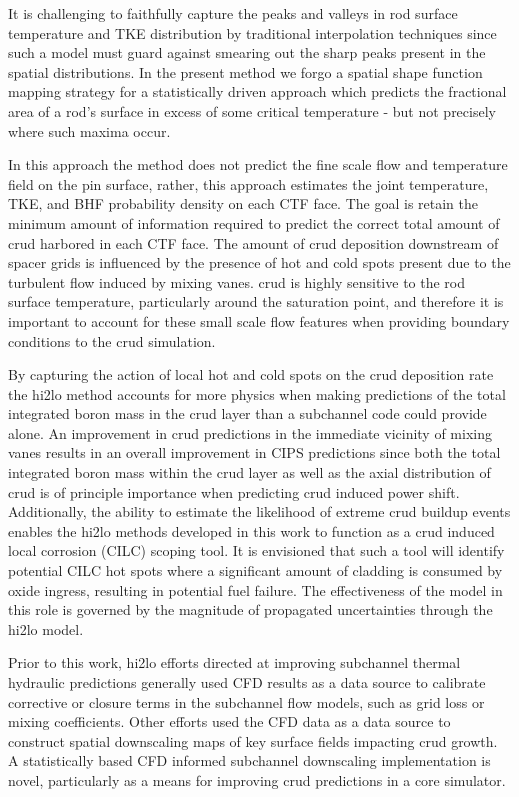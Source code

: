 It is challenging to faithfully capture the peaks and valleys in
rod surface temperature and TKE distribution by traditional interpolation
techniques since such a model must guard against smearing out the sharp peaks
present in the spatial distributions.
In the present method we forgo a spatial shape function mapping strategy
for a statistically driven approach which predicts the fractional
area of a rod's surface in excess of some critical temperature - but not
precisely where such maxima occur.

In this approach the method does not predict the fine scale flow and temperature field on the pin surface, rather, this approach estimates the joint temperature, TKE, and BHF probability density on each CTF face.  The goal is retain the minimum amount of information required to predict the correct total amount of crud harbored in each CTF face.  The amount of crud deposition downstream of spacer grids is influenced by the presence of hot and cold spots present due to the turbulent flow induced by mixing vanes.  crud is highly sensitive to the rod surface temperature, particularly around the saturation point, and therefore it is important to account for these small scale flow features when providing boundary conditions to the crud simulation.

By capturing the action of local hot and cold spots on the crud deposition rate the hi2lo method accounts for more physics when making predictions of the total integrated boron mass in the crud layer than a subchannel code could provide alone.  An improvement in crud predictions in the immediate vicinity of mixing vanes results in an overall improvement in CIPS predictions since both the total integrated boron mass within the crud layer as well as the axial distribution of crud is of principle importance when predicting crud induced power shift.  Additionally, the ability to estimate the likelihood of extreme crud buildup events enables the hi2lo methods developed in this work to function as a crud induced local corrosion (CILC) scoping tool.  It is envisioned that such a tool will identify potential CILC hot spots where a significant amount of cladding is consumed by oxide ingress, resulting in potential fuel failure.  The effectiveness of the model in this role is governed by the magnitude of propagated uncertainties through the hi2lo model.

Prior to this work, hi2lo efforts directed at improving subchannel thermal hydraulic predictions generally used CFD results as a data source to calibrate corrective or closure terms in the subchannel flow models, such as grid loss or mixing coefficients.  Other efforts used the CFD data as a data source to construct spatial downscaling maps of key surface fields impacting crud growth.  A statistically based CFD informed subchannel downscaling implementation is novel, particularly as a means for improving crud predictions in a core simulator.

